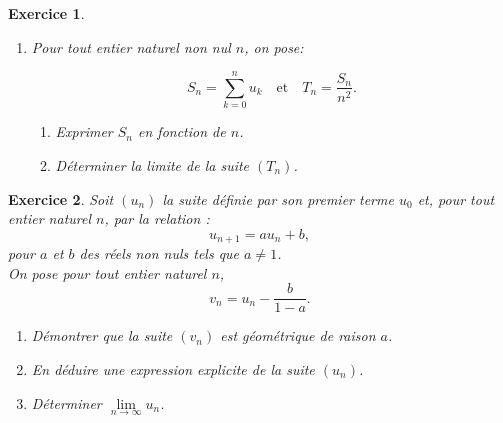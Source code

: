 \documentclass[10pt]{article}
\theoremstyle{exostyle}
\newtheorem{exercice}{Exercice}
\begin{document}
\begin{exercice}
\begin{enumerate}
\begin{enumerate}
                        \[u_{n} = 2\left(\dfrac{2}{3} \right)^n + n\]

                  \item Déterminer la limite de la suite $\left(u_{n}\right)$.
              \end{enumerate}
        \item Pour tout entier naturel non nul $n$, on pose:

              \[S_{n} = \sum_{k=0}^n u_{k} \quad \text{et}
                  \quad T_{n} = \dfrac{S_{n}}{n^2}.\]

              \begin{enumerate}
                  \item Exprimer $S_{n}$ en fonction de $n$.
                  \item Déterminer la limite de la suite $\left(T_{n}\right)$.
              \end{enumerate}
    \end{enumerate}
\end{exercice}

\begin{exercice}
    Soit $(u_n)$ la suite définie par son premier terme $u_0$ et, pour tout entier naturel $n$, par la relation :
    \[
        u_{n+1} = au_n + b,
    \]
    pour $a$ et $b$ des réels non nuls tels que $a\neq 1$.\\
    On pose pour tout entier naturel $n$,
    \[ v_n = u_n - \dfrac{b}{1-a}.\]
    \begin{enumerate}
        \item Démontrer que la suite $(v_n)$ est géométrique de raison $a$.
        \item En déduire une expression explicite de la suite $(u_n)$.
        \item Déterminer $\lim\limits_{n\to\infty} u_n$.
    \end{enumerate}
\end{exercice}
\end{document}

